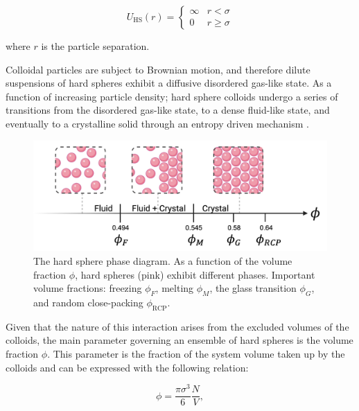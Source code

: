 \begin{equation}
 U_\mathrm{HS}(r) = \begin{cases}
\infty & r < \sigma \\%
0 & r \geq \sigma   
\end{cases}
\label{eq:HSinteraction}
\end{equation}

\noindent where $r$ is the particle separation. 

Colloidal particles are subject to Brownian motion, and therefore dilute suspensions of hard spheres exhibit a diffusive disordered gas-like state. As a function of increasing particle density; hard sphere colloids undergo a series of transitions from the disordered gas-like state, to a dense fluid-like state, and eventually to a crystalline solid through an entropy driven mechanism \cite{wood1957,alder1957}.

\begin{figure}
	\includegraphics[width=\linewidth]{chapters/colloids/figsColloids/figHardSpheres.png}
	\caption[The hard sphere phase diagram.]{The hard sphere phase diagram. As a function of the volume fraction $\phi$, hard spheres (pink) exhibit different phases. Important volume fractions: freezing $\phi_F$, melting $\phi_M$, the glass transition $\phi_G$, and random close-packing $\phi_{\textrm{RCP}}$.}
	\label{fig:HardSpheres}
\end{figure}


Given that the nature of this interaction arises from the excluded volumes of the colloids, the main parameter governing an ensemble of hard spheres is the volume fraction $\phi$. This parameter is the fraction of the system volume taken up by the colloids and can be expressed with the following relation:

\begin{equation}
	\phi = \frac{\pi \sigma^3}{6}\frac{N}{V},
	\label{eq:volumeFraction}
\end{equation}

